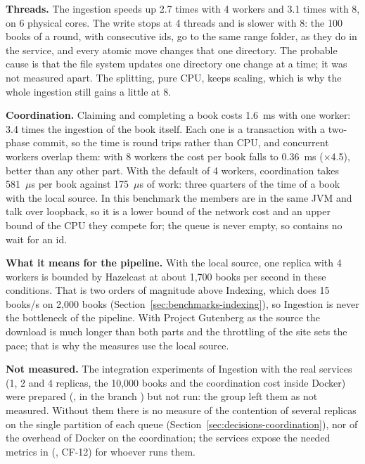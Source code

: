 \textbf{Threads.} The ingestion speeds up 2.7 times with 4 workers and 3.1 times with 8, on 6 physical cores. The write
stops at 4 threads and is slower with 8: the 100 books of a round, with consecutive ids, go to the same range folder, as
they do in the service, and every atomic move changes that one directory. The probable cause is that the file system
updates one directory one change at a time; it was not measured apart.
The splitting, pure CPU, keeps scaling, which is why the whole ingestion still gains a little at 8.

\textbf{Coordination.} Claiming and completing a book costs 1.6~ms with one worker: 3.4 times the ingestion of the book
itself. Each one is a transaction with a two-phase commit, so the time is round trips rather than CPU, and concurrent
workers overlap them: with 8 workers the cost per book falls to 0.36~ms ($\times$4.5), better than any other part.
With the default of 4 workers, coordination takes 581~$\mu$s per book against 175~$\mu$s of work: three quarters of the
time of a book with the local source. In this benchmark the members are in the same JVM and talk over loopback, so it is a
lower bound of the network cost and an upper bound of the CPU they compete for; the queue is never empty, so 
contains no wait for an id.

\textbf{What it means for the pipeline.} With the local source, one replica with 4 workers is bounded by Hazelcast at
about 1,700 books per second in these conditions. That is two orders of magnitude above Indexing, which does 15 books/s on
2,000 books (Section~\ref{sec:benchmarks-indexing}), so Ingestion is never the bottleneck of the pipeline. With Project
Gutenberg as the source the download is much longer than both parts and the throttling of the site sets the pace; that is
why the measures use the local source.

\textbf{Not measured.} The integration experiments of Ingestion with the real services (1, 2 and 4 replicas, the 10,000
books and the coordination cost inside Docker) were prepared (, in the branch
) but not run: the group left them as not measured. Without them there is no
measure of the contention of several replicas on the single partition of each queue
(Section~\ref{sec:decisions-coordination}), nor of the overhead of Docker on the coordination; the services expose the
needed metrics in  (, CF-12) for whoever runs them.
